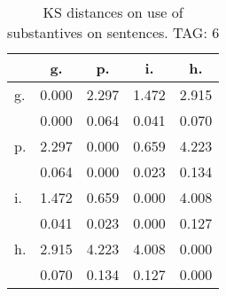 \begin{table}[h!]
\begin{center}
\begin{tabular}{| l | c | c | c | c |}\hline
 & g. & p. & i. & h. \\\hline
g. & 0.000  & 2.297  & 1.472  & 2.915 \\\hline
 & 0.000  & 0.064  & 0.041  & 0.070 \\\hline
p. & 2.297  & 0.000  & 0.659  & 4.223 \\\hline
 & 0.064  & 0.000  & 0.023  & 0.134 \\\hline
i. & 1.472  & 0.659  & 0.000  & 4.008 \\\hline
 & 0.041  & 0.023  & 0.000  & 0.127 \\\hline
h. & 2.915  & 4.223  & 4.008  & 0.000 \\\hline
 & 0.070  & 0.134  & 0.127  & 0.000 \\\hline
\end{tabular}
\caption{KS distances on use of substantives on sentences. TAG: 6}
\end{center}
\end{table}